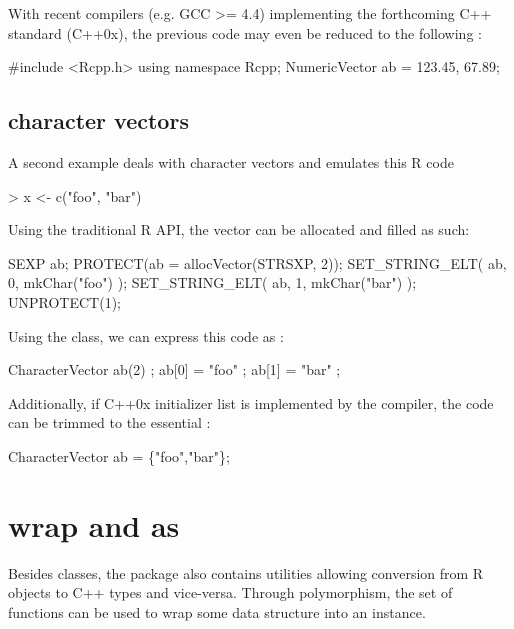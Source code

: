 With recent compilers (e.g. GCC >= 4.4) implementing the forthcoming 
C++ standard (C++0x), the previous code may even be reduced 
to the following :

\begin{example}
#include <Rcpp.h>
using namespace Rcpp;
NumericVector ab = {123.45, 67.89};
\end{example}

\subsection{character vectors}

A second example deals with character vectors and emulates this R code

\begin{example}
> x <- c("foo", "bar")
\end{example}

Using the traditional R API, the vector can be allocated and filled as such:

\begin{example}
SEXP ab;
PROTECT(ab = allocVector(STRSXP, 2));
SET_STRING_ELT( ab, 0, mkChar("foo") );
SET_STRING_ELT( ab, 1, mkChar("bar") );
UNPROTECT(1);
\end{example}

Using the  class, we can express this code as : 

\begin{example}
CharacterVector ab(2) ;
ab[0] = "foo" ;
ab[1] = "bar" ;
\end{example}

Additionally, if C++0x initializer list is implemented by the compiler, the 
code can be trimmed to the essential :

\begin{example}
CharacterVector ab = \{"foo","bar"\};
\end{example}


\section{wrap and as}

Besides classes, the  package also contains utilities allowing
conversion from R objects to C++ types and vice-versa. Through 
polymorphism, the  set of functions can be used to wrap 
some data structure into an  instance. 

